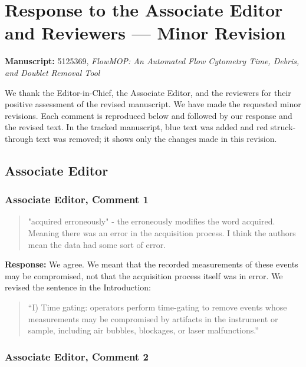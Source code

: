 \documentclass[
  11pt,
  a4paper,
]{article}
\author{}
\date{}
\begin{document}
\section{Response to the Associate Editor and Reviewers --- Minor
Revision}\label{response-to-the-associate-editor-and-reviewers--minor-revision}

\textbf{Manuscript:} 5125369, \emph{FlowMOP: An Automated Flow Cytometry
Time, Debris, and Doublet Removal Tool}

We thank the Editor-in-Chief, the Associate Editor, and the reviewers
for their positive assessment of the revised manuscript. We have made
the requested minor revisions. Each comment is reproduced below and
followed by our response and the revised text. In the tracked
manuscript, blue text was added and red struck-through text was removed;
it shows only the changes made in this revision.

\subsection{Associate Editor}\label{associate-editor}

\subsubsection{Associate Editor, Comment
1}\label{associate-editor-comment-1}

\begin{quote}
"acquired erroneously" - the erroneously modifies the word acquired.
Meaning there was an error in the acquisition process. I think the
authors mean the data had some sort of error.
\end{quote}

\textbf{Response:} We agree. We meant that the recorded measurements of
these events may be compromised, not that the acquisition process itself
was in error. We revised the sentence in the Introduction:

\begin{quote}
``I) Time gating: operators perform time-gating to remove events whose
measurements may be compromised by artifacts in the instrument or
sample, including air bubbles, blockages, or laser malfunctions.''
\end{quote}

\subsubsection{Associate Editor, Comment
2}\label{associate-editor-comment-2}
\end{document}
